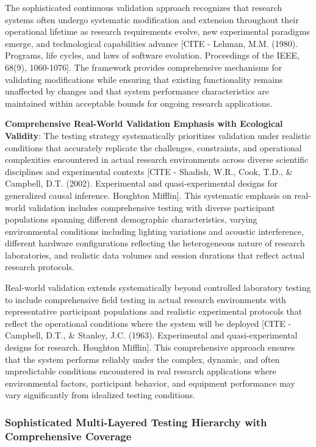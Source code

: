 \documentclass[12pt,a4paper]{article}
\begin{document}
The sophisticated continuous validation approach recognizes that research systems often undergo systematic modification
and extension throughout their operational lifetime as research requirements evolve, new experimental paradigms emerge,
and technological capabilities
advance [CITE - Lehman, M.M. (1980). Programs, life cycles, and laws of software evolution. Proceedings of the IEEE, 68(9), 1060-1076].
The framework provides comprehensive mechanisms for validating modifications while ensuring that existing functionality
remains unaffected by changes and that system performance characteristics are maintained within acceptable bounds for
ongoing research applications.

\textbf{Comprehensive Real-World Validation Emphasis with Ecological Validity}: The testing strategy systematically
prioritizes validation under realistic conditions that accurately replicate the challenges, constraints, and operational
complexities encountered in actual research environments across diverse scientific disciplines and experimental
contexts [CITE - Shadish, W.R., Cook, T.D., \& Campbell, D.T. (2002). Experimental and quasi-experimental designs for generalized causal inference. Houghton Mifflin].
This systematic emphasis on real-world validation includes comprehensive testing with diverse participant populations
spanning different demographic characteristics, varying environmental conditions including lighting variations and
acoustic interference, different hardware configurations reflecting the heterogeneous nature of research laboratories,
and realistic data volumes and session durations that reflect actual research protocols.

Real-world validation extends systematically beyond controlled laboratory testing to include comprehensive field testing
in actual research environments with representative participant populations and realistic experimental protocols that
reflect the operational conditions where the system will be
deployed [CITE - Campbell, D.T., \& Stanley, J.C. (1963). Experimental and quasi-experimental designs for research. Houghton Mifflin].
This comprehensive approach ensures that the system performs reliably under the complex, dynamic, and often
unpredictable conditions encountered in real research applications where environmental factors, participant behavior,
and equipment performance may vary significantly from idealized testing conditions.

\subsubsection{Sophisticated Multi-Layered Testing Hierarchy with Comprehensive Coverage}
\end{document}
